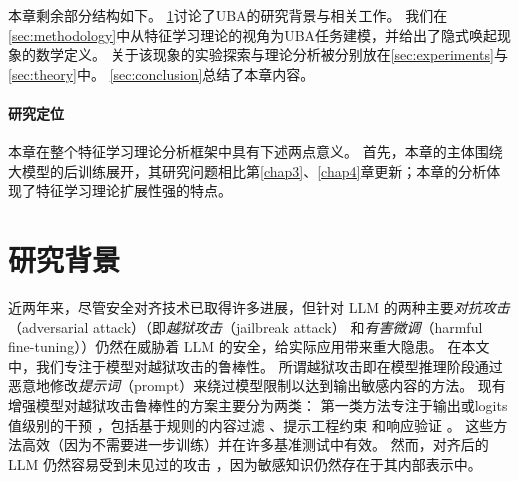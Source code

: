 
本章剩余部分结构如下。
\cref{sec:related works}讨论了UBA的研究背景与相关工作。
我们在\cref{sec:methodology}中从特征学习理论的视角为UBA任务建模，并给出了隐式唤起现象的数学定义。
关于该现象的实验探索与理论分析被分别放在\cref{sec:experiments}与\cref{sec:theory}中。
\cref{sec:conclusion}总结了本章内容。

\paragraph{研究定位}
本章在整个特征学习理论分析框架中具有下述两点意义。
首先，本章的主体围绕大模型的后训练展开，其研究问题相比第\ref{chap3}、\ref{chap4}章更新；本章的分析体现了特征学习理论扩展性强的特点。

\section{研究背景}\label{sec:related works}

近两年来，尽管安全对齐技术已取得许多进展，但针对 LLM 的两种主要\textit{对抗攻击}（adversarial attack）（即\emph{越狱攻击}（jailbreak attack）\cite{DBLP:journals/corr/abs-2307-15043,DBLP:conf/satml/ChaoRDHP025,DBLP:conf/iclr/LiuXCX24} 和\textit{有害微调}（harmful fine-tuning）\cite{DBLP:conf/nips/HuangH024,DBLP:journals/tifs/LiuLMHMTS25}）仍然在威胁着 LLM 的安全，给实际应用带来重大隐患。
在本文中，我们专注于模型对越狱攻击的鲁棒性。
所谓越狱攻击即在模型推理阶段通过恶意地修改\emph{提示词}（prompt）来绕过模型限制以达到输出敏感内容的方法。
现有增强模型对越狱攻击鲁棒性的方案主要分为两类：
第一类方法专注于输出或logits值级别的干预 \cite{DBLP:journals/corr/abs-2212-08073}，包括基于规则的内容过滤 \cite{DBLP:conf/ccs/WuDPCXL024}、提示工程约束 \cite{DBLP:journals/corr/abs-2404-13208} 和响应验证 \cite{DBLP:conf/nips/MadaanTGHGW0DPY23}。 
这些方法高效（因为不需要进一步训练）并在许多基准测试中有效。 
然而，对齐后的 LLM 仍然容易受到未见过的攻击 \cite{DBLP:conf/icml/WeiHHXQXMW024,DBLP:conf/coling/MeiLWBMC25,DBLP:conf/icml/ZhaoCSHLMS25}，因为敏感知识仍然存在于其内部表示中。

